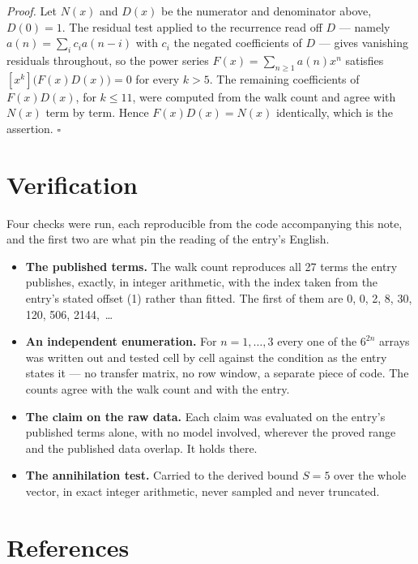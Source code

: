 \documentclass[11pt]{article}
\theoremstyle{definition}
\begin{document}
{\itshape Proof.} Let $N(x)$ and $D(x)$ be the numerator and denominator above, $D(0)=1$. The residual test applied to the recurrence read off $D$ --- namely $a(n) = \sum_i c_i a(n-i)$ with $c_i$ the negated coefficients of $D$ --- gives vanishing residuals throughout, so the power series $F(x)=\sum_{n\ge 1}a(n)x^n$ satisfies $[x^k]\bigl(F(x)D(x)\bigr) = 0$ for every $k > 5$. The remaining coefficients of $F(x)D(x)$, for $k \le 11$, were computed from the walk count and agree with $N(x)$ term by term. Hence $F(x)D(x) = N(x)$ identically, which is the assertion. $\square$

\section{Verification}

Four checks were run, each reproducible from the code accompanying this note, and the first two are what pin the reading of the entry's English.

\begin{itemize}

\item {\bfseries The published terms.} The walk count reproduces all 27 terms the entry publishes, exactly, in integer arithmetic, with the index taken from the entry's stated offset (1) rather than fitted. The first of them are 0, 0, 2, 8, 30, 120, 506, 2144,~\dots

\item {\bfseries An independent enumeration.} For $n = 1,\dots,3$ every one of the $6^{2n}$ arrays was written out and tested cell by cell against the condition as the entry states it --- no transfer matrix, no row window, a separate piece of code. The counts agree with the walk count and with the entry.

\item {\bfseries The claim on the raw data.} Each claim was evaluated on the entry's published terms alone, with no model involved, wherever the proved range and the published data overlap. It holds there.

\item {\bfseries The annihilation test.} Carried to the derived bound $S = 5$ over the whole vector, in exact integer arithmetic, never sampled and never truncated.

\end{itemize}

\section{References}
\end{document}
